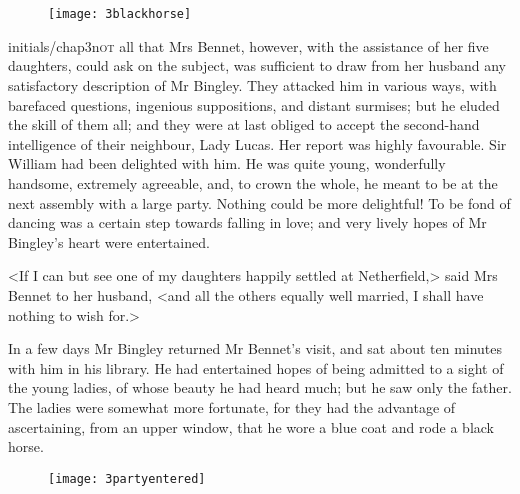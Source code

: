 
\chapter[Chapter \thechapter]{}
	

	\begin{figure}[t!]
		\centering
		\texttt{[image: 3blackhorse]}
	\end{figure}


\lettrine[lines=6,image=true]{initials/chap3n}{ot} all that Mrs Bennet, however, with the assistance of her five daughters, could ask on the subject, was sufficient to draw from her husband any satisfactory description of Mr Bingley. They attacked him in various ways, with barefaced questions, ingenious suppositions, and distant surmises; but he eluded the skill of them all; and they were at last obliged to accept the second-hand intelligence of their neighbour, Lady Lucas. Her report was highly favourable. Sir William had been delighted with him. He was quite young, wonderfully handsome, extremely agreeable, and, to crown the whole, he meant to be at the next assembly with a large party. Nothing could be more delightful! To be fond of dancing was a certain step towards falling in love; and very lively hopes of Mr Bingley's heart were entertained.

<If I can but see one of my daughters happily settled at Netherfield,> said Mrs Bennet to her husband, <and all the others equally well married, I shall have nothing to wish for.>

In a few days Mr Bingley returned Mr Bennet's visit, and sat about ten minutes with him in his library. He had entertained hopes of being admitted to a sight of the young ladies, of whose beauty he had heard much; but he saw only the father. The ladies were somewhat more fortunate, for they had the advantage of ascertaining, from an upper window, that he wore a blue coat and rode a black horse.

\begin{figure}[tbh]
\centering
\texttt{[image: 3partyentered]}
\end{figure}

